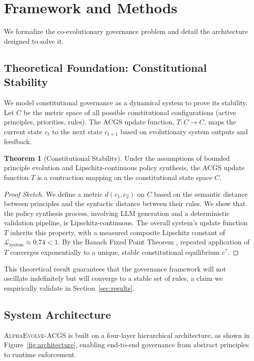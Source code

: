 \documentclass[10pt,twocolumn]{article}
\newcommand{\acgs}{\textsc{AlphaEvolve-ACGS}}
\newcommand{\acgsshort}{\textsc{ACGS}}
\newcommand{\lipschitz}{\mathcal{L}}
\theoremstyle{definition}
\newtheorem{theorem}{Theorem}[section]
\begin{document}
\section{Framework and Methods}
\label{sec:methods}
We formalize the co-evolutionary governance problem and detail the architecture designed to solve it.

\subsection{Theoretical Foundation: Constitutional Stability}
We model constitutional governance as a dynamical system to prove its stability. Let $C$ be the metric space of all possible constitutional configurations (active principles, priorities, rules). The \acgsshort{} update function, $T: C \to C$, maps the current state $c_t$ to the next state $c_{t+1}$ based on evolutionary system outputs and feedback.

\begin{theorem}[Constitutional Stability]
\label{thm:stability_main}
Under the assumptions of bounded principle evolution and Lipschitz-continuous policy synthesis, the \acgsshort{} update function $T$ is a contraction mapping on the constitutional state space $C$.
\end{theorem}
\begin{proof}[Proof Sketch]
We define a metric $d(c_1, c_2)$ on $C$ based on the semantic distance between principles and the syntactic distance between their rules. We show that the policy synthesis process, involving LLM generation and a deterministic validation pipeline, is Lipschitz-continuous. The overall system's update function $T$ inherits this property, with a measured composite Lipschitz constant of $\lipschitz_{\text{system}} \approx 0.74 < 1$. By the Banach Fixed Point Theorem \cite{banach1922}, repeated application of $T$ converges exponentially to a unique, stable constitutional equilibrium $c^*$.
\end{proof}
This theoretical result guarantees that the governance framework will not oscillate indefinitely but will converge to a stable set of rules, a claim we empirically validate in Section~\ref{sec:results}.

\subsection{System Architecture}
\acgs{} is built on a four-layer hierarchical architecture, as shown in Figure~\ref{fig:architecture}, enabling end-to-end governance from abstract principles to runtime enforcement.
\end{document}
